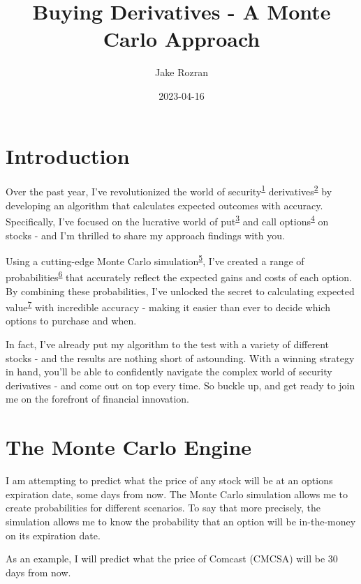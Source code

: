 \documentclass[
]{book}
\title{Buying Derivatives - A Monte Carlo Approach}
\author{Jake Rozran}
\date{2023-04-16}
\begin{document}
\maketitle

{
\setcounter{tocdepth}{1}
\tableofcontents
}
\hypertarget{intro}{%
\chapter{Introduction}\label{intro}}

Over the past year, I've revolutionized the world of security\textsuperscript{\protect\hyperlink{def}{1}}
derivatives\textsuperscript{\protect\hyperlink{def}{2}} by developing an algorithm that calculates expected
outcomes with accuracy. Specifically, I've focused on the lucrative world of
put\textsuperscript{\protect\hyperlink{def}{3}} and call options\textsuperscript{\protect\hyperlink{def}{4}} on stocks - and I'm thrilled to share
my approach findings with you.

Using a cutting-edge Monte Carlo simulation\textsuperscript{\protect\hyperlink{def}{5}}, I've created a range of
probabilities\textsuperscript{\protect\hyperlink{def}{6}} that accurately reflect the expected gains and costs of
each option. By combining these probabilities, I've unlocked the secret to
calculating expected value\textsuperscript{\protect\hyperlink{def}{7}} with incredible accuracy - making it
easier than ever to decide which options to purchase and when.

In fact, I've already put my algorithm to the test with a variety of different
stocks - and the results are nothing short of astounding. With a winning
strategy in hand, you'll be able to confidently navigate the complex world of
security derivatives - and come out on top every time. So buckle up, and get
ready to join me on the forefront of financial innovation.

\hypertarget{mc}{%
\chapter{The Monte Carlo Engine}\label{mc}}

I am attempting to predict what the price of any stock will be at an options
expiration date, some days from now. The Monte Carlo simulation allows me to
create probabilities for different scenarios. To say that more precisely, the
simulation allows me to know the probability that an option will be in-the-money
on its expiration date.

As an example, I will predict what the price of Comcast (CMCSA) will be 30 days
from now.
\end{document}
